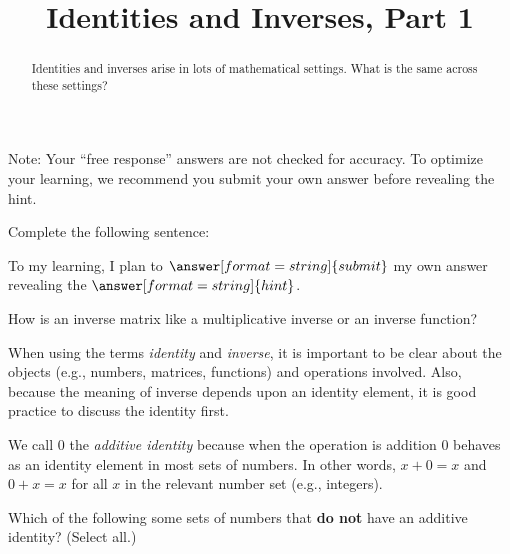 \documentclass[space,nooutcomes]{ximera}
\title{Identities and Inverses, Part 1}
\begin{document}
\begin{abstract}
Identities and inverses arise in lots of mathematical
settings.  What is the same across these settings?  
\end{abstract}
\maketitle


\begin{question}
Note:  Your ``free response'' answers are not checked for accuracy.  To optimize your learning, we recommend you submit your own answer before revealing the hint.  

Complete the following sentence: 

To  my learning, I plan to $\answer[format=string]{submit}$ my own answer  revealing the $\answer[format=string]{hint}$.  
\end{question}

How is an inverse matrix like a multiplicative inverse or an inverse function?  

When using the terms \emph{identity} and \emph{inverse}, it is
important to be clear about the objects (e.g., numbers, matrices,
functions) and operations involved.  Also, because the meaning of
inverse depends upon an identity element, it is good practice to
discuss the identity first.

\begin{definition}
We call $0$ the \emph{additive identity} because when the operation is addition 
$0$ behaves as an identity element in most sets of numbers.  
In other words, $x+0=x$ and $0+x=x$ for all $x$ in the relevant number
set (e.g., integers).
\end{definition}

\begin{question}
Which of the following some sets of numbers that \textbf{do not} have an additive identity?  (Select all.)
\begin{selectAll}
\end{selectAll}
\end{question}
\end{document}
